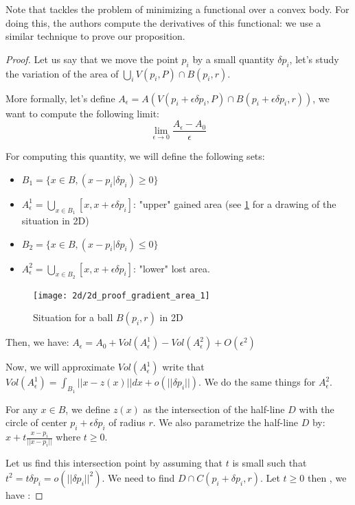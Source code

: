 Note that \cite{lachand2005minimizing} tackles the problem of minimizing a
functional over a convex body. For doing this, the authors compute the
derivatives of this functional: we use a similar technique to prove our
proposition.

\begin{proof}

Let us say that we move the point $ p _i $ by a small quantity $ \delta p_i $,
let's study the variation of the area of $ \bigcup_i V(p_i, P) \cap B(p_i, r) $.

More formally, let's define $ A_{\epsilon} = A(V(p_i + \epsilon \delta p_i, P) \cap
B(p_i + \epsilon \delta p_i, r)) $, we want to compute the following limit:
$$ \lim\limits_{\epsilon \to 0} \frac{A_{\epsilon} - A_0}{\epsilon} $$

For computing this quantity, we will define the following sets:
\begin{itemize}
    \item $ B_1 = \{ x \in B, (x - p_i | \delta p_i) \geq 0\} $
    \item $ A^1_{\epsilon} = \bigcup_{x \in B_1} [x, x + \epsilon \delta p_i] $:
        "upper" gained area (see \ref{fig:demo-gradient} for a drawing of the
        situation in 2D)
    \item $ B_2 = \{ x \in B, (x - p_i | \delta p_i) \leq 0\} $
    \item $ A^2_{\epsilon} = \bigcup_{x \in B_2} [x, x + \epsilon \delta p_i] $:
        "lower" lost area.
\end{itemize}

\begin{figure}[h]
    \centering
    \texttt{[image: 2d/2d\_proof\_gradient\_area\_1]}
    \caption{Situation for a ball $ B(p_i, r) $ in 2D}
    \label{fig:demo-gradient}
\end{figure}

Then, we have: $ A_\epsilon = A_0 + Vol(A^1_\epsilon) - Vol(A^2_\epsilon) +
O(\epsilon^2) $

Now, we will approximate $ Vol(A^1_\epsilon) $ write that $ Vol(A^1_\epsilon) =
\int_{B_1} || x - z(x) || dx + o(||\delta p_i||) $. We do the same things for $
A^2_\epsilon $.

For any $ x \in B $, we define $ z(x) $ as the intersection of the half-line $ D
$ with the circle of center $ p_i + \epsilon \delta p_i $ of radius $ r $. We
also parametrize the half-line $ D $ by: $ x + t \frac{x - p_i}{||x - p_i||} $
where $ t \ge 0 $.

Let us find this intersection point by assuming that $ t $ is small such that $
t^2 = t \delta p_i = o(||\delta p_i||^2) $. We need to find $ D \cap C(p_i +
\delta p_i, r) $. Let $ t \ge 0 $ then , we have :


\end{proof}
